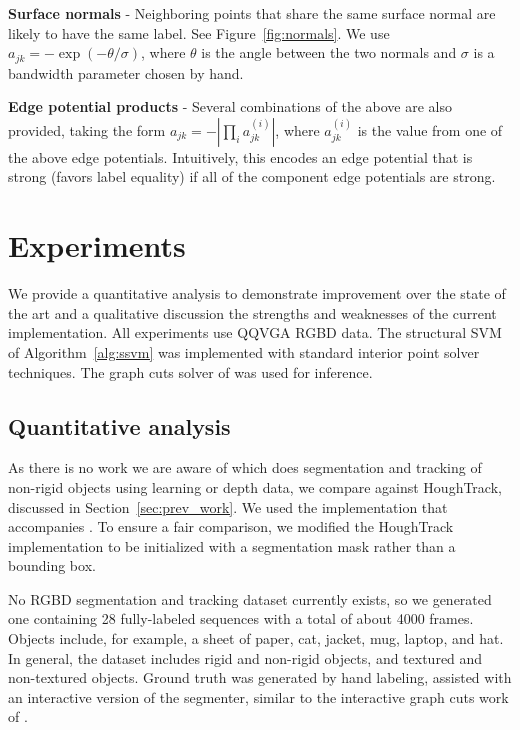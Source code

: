 \documentclass[graybox]{svmult}
\newcommand{\qqvga}{QQVGA\xspace}
\begin{document}
\textbf{Surface normals} - Neighboring points that share the same surface normal are likely to have the same label.  See Figure~\ref{fig:normals}. We use $a_{jk} = - \exp(-\theta / \sigma)$, where $\theta$ is the angle between the two normals and $\sigma$ is a bandwidth parameter chosen by hand.

\textbf{Edge potential products} - Several combinations of the above are also provided, taking the form $a_{jk} = -|\prod_i a^{(i)}_{jk}|$, where $a^{(i)}_{jk}$ is the value from one of the above edge potentials.  Intuitively, this encodes an edge potential that is strong (\ie favors label equality) if all of the component edge potentials are strong.

\section{Experiments}

We provide a quantitative analysis to demonstrate improvement over the state of the art and a qualitative discussion the strengths and weaknesses of the current implementation.  All experiments use \qqvga RGBD data.  The structural SVM of Algorithm~\ref{alg:ssvm} was implemented with standard interior point solver techniques.  The graph cuts solver of \cite{boykov2001a} was used for inference.


\subsection{Quantitative analysis}
\label{sec:quant}

As there is no work we are aware of which does segmentation and tracking of non-rigid objects using learning or depth data, we compare against HoughTrack, discussed in Section~\ref{sec:prev_work}.  We used the implementation that accompanies \cite{godec2011a}.  To ensure a fair comparison, we modified the HoughTrack implementation to be initialized with a segmentation mask rather than a bounding box.

No RGBD segmentation and tracking dataset currently exists, so we generated one containing 28 fully-labeled sequences with a total of about 4000 frames. Objects include, for example, a sheet of paper, cat, jacket, mug, laptop, and hat. In general, the dataset includes rigid and non-rigid objects, and textured and non-textured objects. Ground truth was generated by hand labeling, assisted with an interactive version of the segmenter, similar to the interactive graph cuts work of \cite{boykov2001a}.
\end{document}
